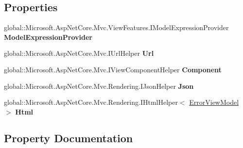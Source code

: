 \subsection*{Properties}
\begin{DoxyCompactItemize}
\item 
global\+::\+Microsoft.\+Asp\+Net\+Core.\+Mvc.\+View\+Features.\+I\+Model\+Expression\+Provider {\bfseries Model\+Expression\+Provider}
\item 
\mbox{\label{class_asp_net_core_1_1_views___shared___error_abaf42ec8e35e72026480e49d001f84c2}} 
global\+::\+Microsoft.\+Asp\+Net\+Core.\+Mvc.\+I\+Url\+Helper {\bfseries Url}
\item 
\mbox{\label{class_asp_net_core_1_1_views___shared___error_aeea5446b7eaa954692ba83fa3be58726}} 
global\+::\+Microsoft.\+Asp\+Net\+Core.\+Mvc.\+I\+View\+Component\+Helper {\bfseries Component}
\item 
\mbox{\label{class_asp_net_core_1_1_views___shared___error_a3faeeba018368097cc9a55dc55015c16}} 
global\+::\+Microsoft.\+Asp\+Net\+Core.\+Mvc.\+Rendering.\+I\+Json\+Helper {\bfseries Json}
\item 
\mbox{\label{class_asp_net_core_1_1_views___shared___error_a103e565d3f056ac7e343f935c52f2c74}} 
global\+::\+Microsoft.\+Asp\+Net\+Core.\+Mvc.\+Rendering.\+I\+Html\+Helper$<$ \mbox{\hyperlink{class_t_net___web_1_1_models_1_1_error_view_model}{Error\+View\+Model}} $>$ {\bfseries Html}
\end{DoxyCompactItemize}


\subsection{Property Documentation}
\mbox{\label{class_asp_net_core_1_1_views___shared___error_a42383ac95c491016358a37b215c6acd3}} 
